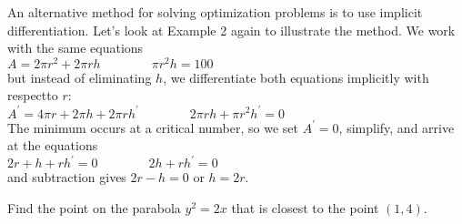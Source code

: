 \documentclass{sebase}
\begin{document}
\ENDBOX%

An alternative method for solving optimization
problems is to use implicit differentiation. Let's look at Example 2 again
to illustrate the method. We work with the same equations\\[6pt]
\hspace*{\fill}$A=2\pi r^{2}+2\pi rh\qquad \qquad \pi r^{2}h=100$\hspace*{%
\fill}\\[6pt]
but instead of eliminating $h$, we differentiate both equations implicitly
with respect\linebreak to $r$:\\[6pt]
\hspace*{\fill}$A^{\prime }=4\pi r+2\pi h+2\pi rh^{\prime }\qquad \qquad
2\pi rh+\pi r^{2}h^{\prime }=0$\hspace*{\fill}\\[6pt]
The minimum occurs at a critical number, so we set $A^{\prime }=0$,
simplify, and arrive at the equations\\[6pt]
\hspace*{\fill}$2r+h+rh^{\prime }=0\qquad \qquad 2h+rh^{\prime }=0$\hspace*{%
\fill}\\[6pt]
and subtraction gives $2r-h=0$ or $h=2r$.

\begin{Example}[3]
\VIDEO%
%
Find the point on the parabola $y^{2}=2x$ that is closest to the point $%
(1,4) $.
\end{Example}
\end{document}
